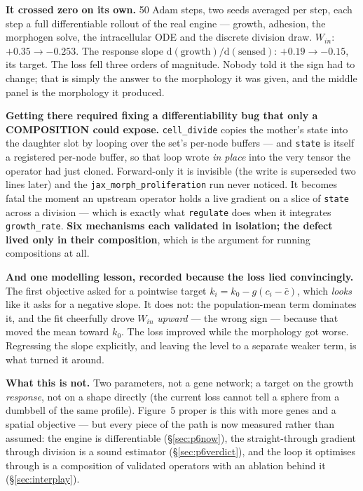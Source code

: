 \documentclass[11pt,a4paper]{article}
\newcommand{\code}[1]{\texttt{#1}}
\begin{document}
\textbf{It crossed zero on its own.} 50 Adam steps, two seeds averaged per step, each step a full
differentiable rollout of the real engine --- growth, adhesion, the morphogen solve, the
intracellular ODE and the discrete division draw. $W_{in}$: $+0.35 \to -0.253$. The response
slope $\mathrm{d(growth)}/\mathrm{d(sensed)}$: $+0.19 \to -0.15$, its target. The loss fell three
orders of magnitude. Nobody told it the sign had to change; that is simply the answer to the
morphology it was given, and the middle panel is the morphology it produced.

\textbf{Getting there required fixing a differentiability bug that only a COMPOSITION could
expose.} \code{cell\_divide} copies the mother's state into the daughter slot by looping over the
set's per-node buffers --- and \code{state} is itself a registered per-node buffer, so that loop
wrote \emph{in place} into the very tensor the operator had just cloned. Forward-only it is
invisible (the write is superseded two lines later) and the \code{jax\_morph\_proliferation} run
never noticed. It becomes fatal the moment an upstream operator holds a live gradient on a slice
of \code{state} across a division --- which is exactly what \code{regulate} does when it
integrates \code{growth\_rate}. \textbf{Six mechanisms each validated in isolation; the defect
lived only in their composition}, which is the argument for running compositions at all.

\textbf{And one modelling lesson, recorded because the loss lied convincingly.} The first
objective asked for a pointwise target $k_i = k_0 - g(c_i - \bar{c})$, which \emph{looks} like it
asks for a negative slope. It does not: the population-mean term dominates it, and the fit
cheerfully drove $W_{in}$ \emph{upward} --- the wrong sign --- because that moved the mean toward
$k_0$. The loss improved while the morphology got worse. Regressing the slope explicitly, and
leaving the level to a separate weaker term, is what turned it around.

\textbf{What this is not.} Two parameters, not a gene network; a target on the growth
\emph{response}, not on a shape directly (the current loss cannot tell a sphere from a dumbbell of
the same profile). Figure~5 proper is this with more genes and a spatial objective --- but every
piece of the path is now measured rather than assumed: the engine is differentiable
(\S\ref{sec:p6now}), the straight-through gradient through division is a sound estimator
(\S\ref{sec:p6verdict}), and the loop it optimises through is a composition of validated
operators with an ablation behind it (\S\ref{sec:interplay}).
\end{document}

